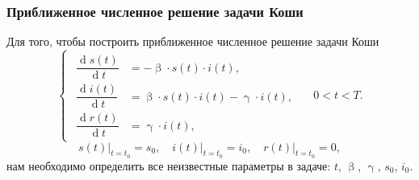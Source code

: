 \documentclass[a4paper, 12pt]{extarticle}
\numberwithin{equation}{section}
\renewcommand{\beta}{\upbeta}
\renewcommand{\gamma}{\upgamma}
\renewcommand{\d}{\operatorname{d}}
\begin{document}
	\subsubsection{Приближенное численное решение задачи Коши}
	Для того, чтобы построить приближенное численное решение задачи Коши 
	$$
	\left\{ 
	\begin{gathered} 
		\begin{aligned}
			\dfrac {\d s(t)}{\d t} &= -\beta \cdot s(t) \cdot i(t),\\
			\dfrac{\d i(t)}{\d t} &= \beta \cdot s(t)\cdot i(t) - \gamma\cdot i(t),\\
			\dfrac{\d r(t)}{\d t} &= \gamma\cdot i(t),
		\end{aligned}
	\end{gathered} 
	\right. \quad 0 < t < T.
	$$
	$$
	s(t)\Big|_{t=t_0} = s_0,\quad i(t)\Big|_{t=t_0} = i_0,\quad r(t)\Big|_{t=t_0} = 0,
	$$ 
	нам необходимо определить все неизвестные параметры в задаче: $t$, $\beta$, $\gamma$, $s_0$, $i_0$.
	
\end{document}
